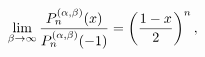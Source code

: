 \[\lim_{\beta\to\infty}\frac{\mathop{P^{(\alpha,\beta)}_{n}\/}\nolimits\!\left(x%
\right)}{\mathop{P^{(\alpha,\beta)}_{n}\/}\nolimits\!\left(-1\right)}=\left(%
\frac{1-x}{2}\right)^{n},\]